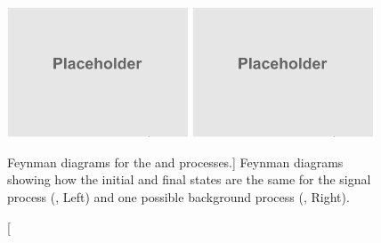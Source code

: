 \begin{figure}[!htbp]
	\begin{center}
		\includegraphics[width=0.48\textwidth]{figures/placeholder.png}
		\includegraphics[width=0.48\textwidth]{figures/placeholder.png}
		\caption
			[Feynman diagrams for the \gghzzfourl and \ggzzstarfourl processes.]
			{
            Feynman diagrams showing how the initial and final states are the same
            for the signal process (\gghzzfourl, Left) and one possible background process (\ggzzstarfourl, Right).
			}
		\label{fig:feyndiag_sig_vs_bkg}
	\end{center}
\end{figure}

